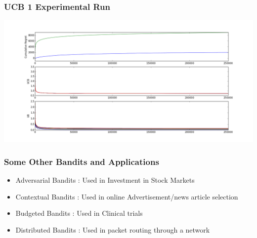 \documentclass{beamer}
\begin{document}

\begin{frame}
\frametitle{UCB 1 Experimental Run}
\begin{center}
\includegraphics[scale=0.3]{img/ucb.png}
\end{center}

\end{frame}


\begin{frame}
\frametitle{Some Other Bandits and Applications}

\begin{itemize}
\item Adversarial Bandits : Used in Investment in Stock Markets
\item Contextual Bandits : Used in online Advertisement/news article selection
\item Budgeted Bandits : Used in Clinical trials
\item Distributed Bandits : Used in packet routing through a network
\end{itemize}

\end{frame}

\end{document}
